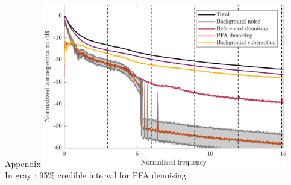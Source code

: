 \documentclass[10pt,xcolor=x11names,compress, show notes]{beamer}%
\begin{document}
\begin{frame}{Appendix}
\centering
\includegraphics[width=0.8\textwidth]{ic_95pc.png}\\
In gray : 95\% credible interval for PFA denoising
\end{frame}
\end{document}
